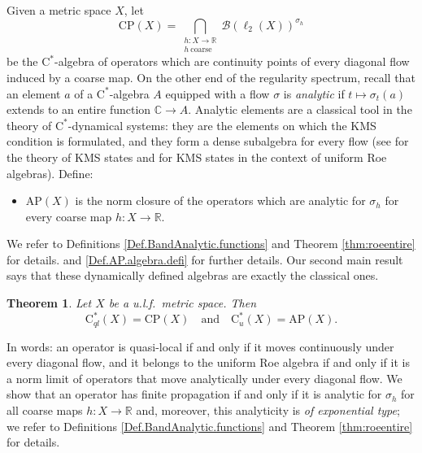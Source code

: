 \documentclass[11pt]{amsart}
\newcommand{\R}{\mathbb{R}}
\numberwithin{equation}{section}
\newtheorem{theoremi}{Theorem}
\theoremstyle{definition}
\theoremstyle{remark}
\begin{document}
Given a metric 
space $X$, let
\[
\mathrm{CP}(X)=\bigcap_{\substack{h\colon X\to\mathbb{R}\\ h\ \text{coarse}}}\mathcal{B}(\ell_2(X))^{\sigma_h}
\]
be the $\mathrm{C}^*$-algebra of operators which are continuity points of every
diagonal flow induced by a coarse map. On the other end of the regularity
spectrum, recall that an element $a$ of a $\mathrm{C}^*$-algebra $A$ equipped
with a flow $\sigma$ is \emph{analytic} if $t\mapsto\sigma_t(a)$ extends to an
entire function $\mathbb{C}\to A$. Analytic elements are a classical tool in the theory of
$\mathrm{C}^*$-dynamical systems: they are the elements on which the KMS
condition is formulated, and they form a dense subalgebra for every flow
(see \cite{BratteliRobinsonBookII1997} for the theory of KMS states and \cite{BragaExel2023} for KMS states in the context of uniform Roe algebras). Define: \begin{itemize}
    \item $\mathrm{AP}(X)$ is the norm closure of the operators which are
analytic for $\sigma_h$ for every coarse map $h\colon X\to \R$.
\end{itemize}
We refer to   Definitions \ref{Def.BandAnalytic.functions} and Theorem \ref{thm:roeentire} for details. and 
\ref{Def.AP.algebra.defi} for further details. Our second main result says that these
dynamically defined algebras are exactly the classical ones.



\begin{theoremi}\label{thmB}
Let $X$ be a u.l.f.\ metric space. Then
\[
\mathrm{C}^*_{ql}(X)=\mathrm{CP}(X)\quad\text{and}\quad \mathrm{C}^*_u(X)=\mathrm{AP}(X).\]
\end{theoremi}

In words: an operator is quasi-local if and only if it moves continuously under
every diagonal flow, and it belongs to the uniform Roe algebra if and only if it is a norm limit of operators that
move analytically  under every diagonal flow.  We show that an operator has finite propagation if and only if it is analytic for $\sigma_h$ for all coarse maps $h\colon X\to \R$ and, moreover, this analyticity is \emph{of exponential type}; we refer to Definitions \ref{Def.BandAnalytic.functions} and Theorem \ref{thm:roeentire} for details.  
\end{document}
